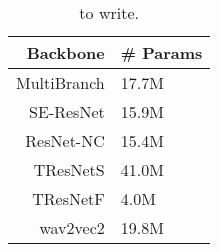 

\begin{table}[!htp]
\centering
\begin{tabular}{r|l}
    \hline
    Backbone & \# Params \\ \hline
    MultiBranch & 17.7M \\
    SE-ResNet & 15.9M \\
    ResNet-NC & 15.4M \\
    TResNetS & 41.0M \\
    TResNetF & 4.0M \\
    wav2vec2 & 19.8M \\ \hline
\end{tabular}
\caption{to write.}
\label{tab:nn_backbone}
\end{table}
